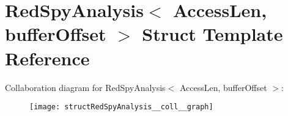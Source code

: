 \hypertarget{structRedSpyAnalysis}{\section{Red\-Spy\-Analysis$<$ Access\-Len, buffer\-Offset $>$ Struct Template Reference}
\label{structRedSpyAnalysis}
}


Collaboration diagram for Red\-Spy\-Analysis$<$ Access\-Len, buffer\-Offset $>$\-:
\nopagebreak
\begin{figure}[H]
\begin{center}
\leavevmode
\texttt{[image: structRedSpyAnalysis\_\_coll\_\_graph]}
\end{center}
\end{figure}
